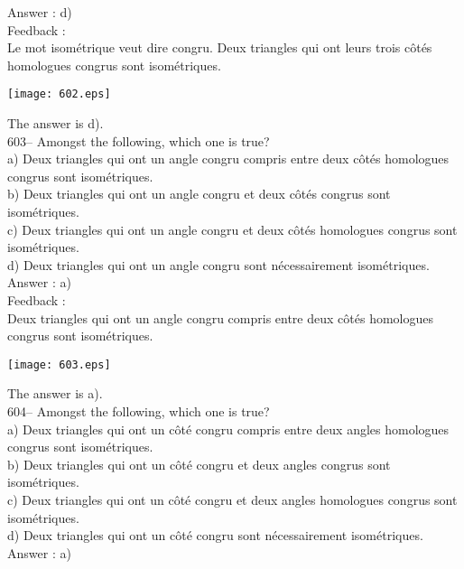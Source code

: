 ﻿\documentclass[letterpaper, 12pt]{article}
\begin{document}
Answer : d)\\

Feedback : \\
Le mot isom\'etrique veut dire congru.  Deux triangles qui ont leurs
trois c\^ot\'es homologues congrus sont isom\'etriques.
\begin{center}
    \texttt{[image: 602.eps]}
    \end{center} The answer is d).\\

603-- Amongst the following, which one is true?\\
a) Deux triangles qui ont un angle congru compris entre deux c\^ot\'es
homologues congrus sont isom\'etriques. \\
b) Deux triangles qui ont un angle congru et deux c\^ot\'es congrus sont
isom\'etriques.\\
c) Deux triangles qui ont un angle congru et deux c\^ot\'es homologues
congrus sont isom\'etriques.\\
d) Deux triangles qui ont un angle congru sont n\'ecessairement
isom\'etriques.\\

Answer : a)\\

Feedback : \\
Deux triangles qui ont un angle congru compris entre deux c\^ot\'es
homologues congrus sont isom\'etriques.   \begin{center}
    \texttt{[image: 603.eps]}
    \end{center}  The answer is a).\\

604-- Amongst the following, which one is true?\\
a) Deux triangles qui ont un c\^ot\'e congru compris entre deux angles
homologues congrus sont isom\'etriques.\\
b) Deux triangles qui ont un c\^ot\'e congru et deux angles congrus sont
isom\'etriques.\\
c) Deux triangles qui ont un c\^ot\'e congru et deux angles homologues
congrus sont isom\'etriques.\\
d) Deux triangles qui ont un c\^ot\'e congru sont n\'ecessairement
isom\'etriques.\\

Answer : a) \\
\end{document}
